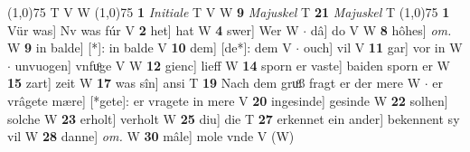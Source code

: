 \documentclass[8pt,a4paper,notitlepage]{article}
\begin{document}
\begin{table}[ht]
\begin{minipage}[t]{0.5\linewidth}
\begin{tabular}{rl}
\end{tabular}
\scriptsize
\line(1,0){75} \newline
T V W \newline
\line(1,0){75} \newline
\textbf{1} \textit{Initiale} T V W  \textbf{9} \textit{Majuskel} T  \textbf{21} \textit{Majuskel} T  \newline
\line(1,0){75} \newline
\textbf{1} Vür was] Nv was fúr V \textbf{2} het] hat W \textbf{4} swer] Wer W  $\cdot$ dâ] do V W \textbf{8} hôhes] \textit{om.} W \textbf{9} in balde] [*]: in balde V \textbf{10} dem] [de*]: dem V  $\cdot$ ouch] vil V \textbf{11} gar] vor in W  $\cdot$ unvuogen] vnfuͦge V W \textbf{12} gienc] lieff W \textbf{14} sporn er vaste] baiden sporn er W \textbf{15} zart] zeit W \textbf{17} was sîn] ansi T \textbf{19} Nach dem gruͦß fragt er der mere W  $\cdot$ er vrâgete mære] [*gete]: er vragete in mere V \textbf{20} ingesinde] gesinde W \textbf{22} solhen] solche W \textbf{23} erholt] verholt W \textbf{25} diu] die T \textbf{27} erkennet ein ander] bekennent sy vil W \textbf{28} danne] \textit{om.} W \textbf{30} mâle] mole vnde V (W) \newline
\end{minipage}
\end{table}
\end{document}
